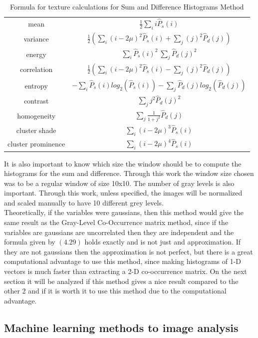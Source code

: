 \begin{table}[H]
\centering
\begin{tabular}{ |c |c |}
 \hline
 mean & $\frac{1}{2}\sum_i i\hat{P}_s(i)$\\ 
 variance & $\frac{1}{2}(\sum_i (i-2\mu)^2\hat{P}_s(i) + \sum_j (j)^2\hat{P}_d(j))$\\
 energy & $\sum_i \hat{P}_s(i)^2 \ \sum_j \hat{P}_d(j)^2$\\
 correlation & $\frac{1}{2}(\sum_i (i-2\mu)^2\hat{P}_s(i) - \sum_j (j)^2\hat{P}_d(j))$\\
 entropy & $-\sum_i\hat{P}_s(i)log_2(\hat{P}_s(i)) - \sum_j\hat{P}_d(j)log_2(\hat{P}_d(j))$\\
 contrast & $\sum_j j^2 \hat{P}_d(j)^2$\\
 homogeneity & $\sum_j\frac{1}{1+j^2} \hat{P}_d(j)$\\
 cluster shade & $\sum_i (i-2\mu)^3 \hat{P}_s(i)$\\
 cluster prominence & $\sum_i (i-2\mu)^4 \hat{P}_s(i)$\\
 \hline
\end{tabular}
\caption{Formula for texture calculations for Sum and Difference Histograms Method}
\label{table:sum_and_diff_calculations}
\end{table}


It is also important to know which size the window should be to compute the histograms for the sum and difference. Through this work the window size chosen was to be a regular window of size 10x10.
The number of gray levels is also important. Through this work, unless specified, the images will be normalized and scaled manually to have 10 different grey levels.
\\
Theoretically, if the variables were gaussians, then this method would give the same result as the Gray-Level Co-Occurrence matrix method, since if the variables are gaussians are uncorrelated then they are independent and the formula given by $(4.29)$ holds exactly and is not just and approximation. If they are not gaussians then the approximation is not perfect, but there is a great computational advantage to use this method, since making histograms of 1-D vectors is much faster than extracting a 2-D co-occurrence matrix. On the next section it will be analyzed if this method gives a nice result compared to the other 2 and if it is worth it to use this method due to the computational advantage.


\subsection{Machine learning methods to image analysis}


